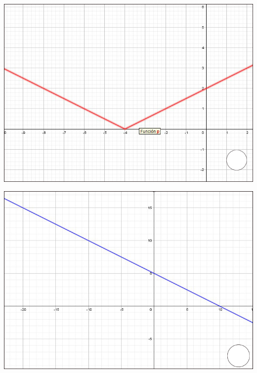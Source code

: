 \documentclass[12pt, addpoints, answers]{exam}
\begin{document}
\begin{questions}
		
\vspace{1in}
\noindent %
\begin{minipage}[t]{0.23\linewidth}
\includegraphics[width=1\linewidth]{Figuras/fig1}
\end{minipage}\hfill
\begin{minipage}[t]{0.23\linewidth}
	\includegraphics[width=1\linewidth]{Figuras/fig2}

\end{minipage}
\end{questions}
\end{document}
